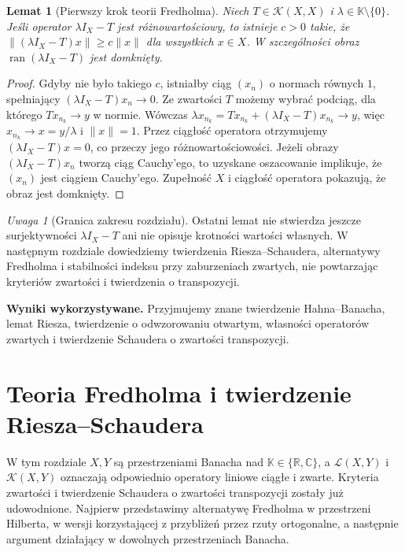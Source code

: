 \documentclass[11pt,a4paper]{article}
\numberwithin{equation}{section}
\theoremstyle{plain}
\newtheorem{lemat}[twierdzenie]{Lemat}
\theoremstyle{definition}
\theoremstyle{remark}
\newtheorem{uwaga}[twierdzenie]{Uwaga}
\newcommand{\R}{\mathbb R}
\newcommand{\C}{\mathbb C}
\newcommand{\K}{\mathbb K}
\begin{document}
\begin{lemat}[Pierwszy krok teorii Fredholma]
\label{lem:compact-eigenvalue29}
Niech $T\in\mathcal K(X,X)$ i $\lambda\in\K\setminus\{0\}$.
Jeśli operator $\lambda I_X-T$ jest różnowartościowy,
to istnieje $c>0$ takie, że
$\|(\lambda I_X-T)x\|\ge c\|x\|$ dla wszystkich $x\in X$.
W szczególności obraz $\operatorname{ran}(\lambda I_X-T)$
jest domknięty.
\end{lemat}
\begin{proof}
Gdyby nie było takiego $c$, istniałby ciąg $(x_n)$
o normach równych $1$, spełniający
$(\lambda I_X-T)x_n\to0$. Ze zwartości $T$ możemy
wybrać podciąg, dla którego $Tx_{n_k}\to y$ w normie.
Wówczas $\lambda x_{n_k}=Tx_{n_k}+
(\lambda I_X-T)x_{n_k}\to y$, więc $x_{n_k}\to x=y/\lambda$
i $\|x\|=1$. Przez ciągłość operatora otrzymujemy
$(\lambda I_X-T)x=0$, co przeczy jego różnowartościowości.
Jeżeli obrazy $(\lambda I_X-T)x_n$ tworzą ciąg Cauchy'ego,
to uzyskane oszacowanie implikuje, że $(x_n)$ jest
ciągiem Cauchy'ego. Zupełność $X$ i ciągłość operatora
pokazują, że obraz jest domknięty.
\end{proof}

\begin{uwaga}[Granica zakresu rozdziału]
\label{rem:fredholm-next29}
Ostatni lemat nie stwierdza jeszcze surjektywności
$\lambda I_X-T$ ani nie opisuje krotności wartości
własnych. W następnym rozdziale dowiedziemy twierdzenia
Riesza--Schaudera, alternatywy Fredholma i stabilności
indeksu przy zaburzeniach zwartych, nie powtarzając
kryteriów zwartości i twierdzenia o transpozycji.
\end{uwaga}


\setcounter{section}{29}
\noindent\textbf{Wyniki wykorzystywane.} Przyjmujemy znane twierdzenie Hahna--Banacha,
lemat Riesza, twierdzenie o odwzorowaniu otwartym, własności operatorów
zwartych i twierdzenie Schaudera o zwartości transpozycji.
\par\medskip

\section{Teoria Fredholma i twierdzenie Riesza--Schaudera}
\label{sec:fredholm30}

W tym rozdziale $X,Y$ są przestrzeniami Banacha nad
$\K\in\{\R,\C\}$, a $\mathcal L(X,Y)$ i $\mathcal K(X,Y)$
oznaczają odpowiednio operatory liniowe ciągłe i zwarte.
Kryteria zwartości i twierdzenie Schaudera o zwartości transpozycji
zostały już udowodnione. Najpierw przedstawimy alternatywę
Fredholma w przestrzeni Hilberta, w wersji korzystającej z
przybliżeń przez rzuty ortogonalne, a następnie argument
działający w dowolnych przestrzeniach Banacha.
\end{document}
